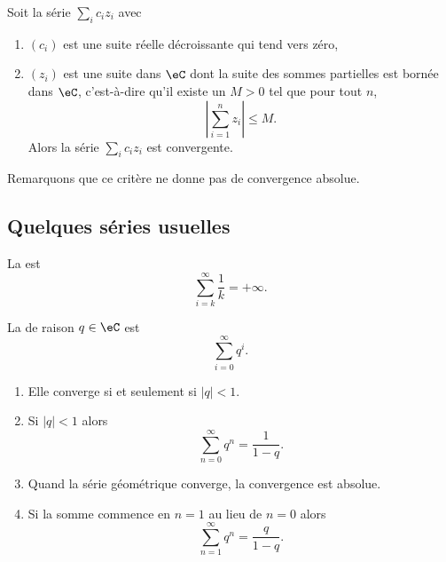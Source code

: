 \begin{proposition}
    Soit la série $\sum_i c_iz_i$ avec
    \begin{enumerate}
        \item $(c_i)$ est une suite réelle décroissante qui tend vers zéro,
        \item $(z_i)$ est une suite dans $\eC$ dont la suite des sommes partielles est bornée dans $\eC$, c'est-à-dire qu'il existe un $M>0$ tel que pour tout $n$,
        \begin{equation}
            \left| \sum_{i=1}^nz_i \right| \leq M.
        \end{equation}
        Alors la série $\sum_ic_iz_i$ est convergente.
    \end{enumerate}
\end{proposition}
Remarquons que ce critère ne donne pas de convergence absolue.

\subsection{Quelques séries usuelles}
\label{SUBSECooDTYHooZjXXJf}

\begin{example}       \label{EXooDVQZooEZGoiG}
    La  est
    \begin{equation}
        \sum_{i=k}^\infty \frac{1}{ k }=+\infty.
    \end{equation}
\end{example}

\begin{propositionDef}      \label{PROPooWOWQooWbzukS}
    La  de raison $q \in \eC$ est
    \begin{equation}    \label{EqZQTGooIWEFxL} 
        \sum_{i=0}^\infty q^i.
    \end{equation}
    \begin{enumerate}
        \item
            Elle converge si et seulement si \( | q |<1\).
        \item       \label{ITEMooBJHBooBMEmiG}
            Si \( | q |<1\) alors
    \begin{equation}    \label{EqRGkBhrX}
        \sum_{n=0}^{\infty}q^n=\frac{ 1 }{ 1-q }.
    \end{equation}
\item
        Quand la série géométrique converge, la convergence est absolue.
    \item
        Si la somme commence en \( n=1\) au lieu de \( n=0\) alors
        \begin{equation}        \label{EqPZOWooMdSRvY}
            \sum_{n=1}^{\infty}q^n=\frac{ q }{ 1-q }.
        \end{equation}
    \end{enumerate}
\end{propositionDef}

